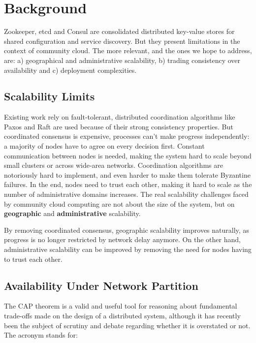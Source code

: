 \documentclass{sig-alternate}
\begin{document}
\section{Background}

Zookeeper, etcd and Consul are consolidated distributed key-value stores for shared configuration and service discovery. But they present limitations in the context of community cloud. The more relevant, and the ones we hope to address, are: a) geographical and administrative scalability, b) trading consistency over availability and c) deployment complexities.

\subsection{Scalability Limits}

Existing work rely on fault-tolerant, distributed coordination algorithms like Paxos\cite{lamport2001paxos} and Raft\cite{ongaro2014search} are used because of their strong consistency properties. But coordinated consensus is expensive, processes can't make progress independently: a majority of nodes have to agree on every decision first. Constant communication between nodes is needed, making the system hard to scale beyond small clusters or across wide-area networks. 
Coordination algorithms are notoriously hard to implement\cite{ongaro2014search}, and even harder to make them tolerate Byzantine failures. In the end, nodes need to trust each other, making it hard to scale as the number of administrative domains increases. The real scalability challenges faced by community cloud computing are not about the size of the system, but on \textbf{geographic} and \textbf{administrative} scalability.

By removing coordinated consensus, geographic scalability improves naturally, as progress is no longer restricted by network delay anymore. On the other hand, administrative scalability can be improved by removing the need for nodes having to trust each other. 

\subsection{Availability Under Network Partition}

The CAP theorem is a valid and useful tool for reasoning about fundamental trade-offs made on the design of a distributed system\cite{brewer2012cap}, although it has recently been the subject of scrutiny and debate regarding whether it is overstated or not\cite{Kleppmann:CAP}. The acronym stands for:
\end{document}
